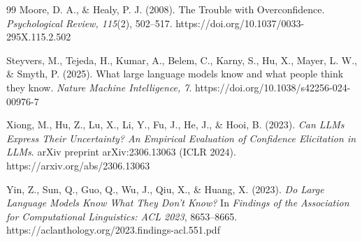 \documentclass[twoside,twocolumn,10pt]{article}
\begin{document}
\begin{thebibliography}{99}
Moore, D. A., \& Healy, P. J. (2008).
The Trouble with Overconfidence.
\textit{Psychological Review, 115}(2), 502--517.
https://doi.org/10.1037/0033-295X.115.2.502

Steyvers, M., Tejeda, H., Kumar, A., Belem, C., Karny, S., Hu, X., Mayer, L. W., \& Smyth, P. (2025).
What large language models know and what people think they know.
\textit{Nature Machine Intelligence, 7}.
https://doi.org/10.1038/s42256-024-00976-7

Xiong, M., Hu, Z., Lu, X., Li, Y., Fu, J., He, J., \& Hooi, B. (2023).
\textit{Can LLMs Express Their Uncertainty? An Empirical Evaluation of Confidence Elicitation in LLMs}.
arXiv preprint arXiv:2306.13063 (ICLR 2024).
https://arxiv.org/abs/2306.13063

Yin, Z., Sun, Q., Guo, Q., Wu, J., Qiu, X., \& Huang, X. (2023).
\textit{Do Large Language Models Know What They Don't Know?}
In \textit{Findings of the Association for Computational Linguistics: ACL 2023}, 8653--8665.
https://aclanthology.org/2023.findings-acl.551.pdf

\end{thebibliography}
\end{document}
